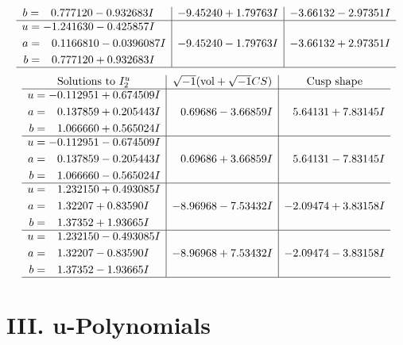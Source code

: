 \documentclass[1p]{elsarticle_modified}
\theoremstyle{definition}
\newcommand{\I}{\sqrt{-1}}
\begin{document}
$$\begin{array}{c|c|c}
\begin{aligned}
b &= \phantom{-}0.777120 - 0.932683 I\end{aligned}
 & -9.45240 + 1.79763 I & -3.66132 - 2.97351 I \\ \hline\begin{aligned}
u &= -1.241630 - 0.425857 I \\
a &= \phantom{-}0.1166810 - 0.0396087 I \\
b &= \phantom{-}0.777120 + 0.932683 I\end{aligned}
 & -9.45240 - 1.79763 I & -3.66132 + 2.97351 I\\
 \hline 
 \end{array}$$\newpage$$\begin{array}{c|c|c}  
\text{Solutions to }I^u_{2}& \I (\text{vol} + \sqrt{-1}CS) & \text{Cusp shape}\\
 \hline 
\begin{aligned}
u &= -0.112951 + 0.674509 I \\
a &= \phantom{-}0.137859 + 0.205443 I \\
b &= \phantom{-}1.066660 + 0.565024 I\end{aligned}
 & \phantom{-}0.69686 - 3.66859 I & \phantom{-}5.64131 + 7.83145 I \\ \hline\begin{aligned}
u &= -0.112951 - 0.674509 I \\
a &= \phantom{-}0.137859 - 0.205443 I \\
b &= \phantom{-}1.066660 - 0.565024 I\end{aligned}
 & \phantom{-}0.69686 + 3.66859 I & \phantom{-}5.64131 - 7.83145 I \\ \hline\begin{aligned}
u &= \phantom{-}1.232150 + 0.493085 I \\
a &= \phantom{-}1.32207 + 0.83590 I \\
b &= \phantom{-}1.37352 + 1.93665 I\end{aligned}
 & -8.96968 - 7.53432 I & -2.09474 + 3.83158 I \\ \hline\begin{aligned}
u &= \phantom{-}1.232150 - 0.493085 I \\
a &= \phantom{-}1.32207 - 0.83590 I \\
b &= \phantom{-}1.37352 - 1.93665 I\end{aligned}
 & -8.96968 + 7.53432 I & -2.09474 - 3.83158 I\\
 \hline 
 \end{array}$$\newpage
\newpage\renewcommand{\arraystretch}{1}
\centering \section*{ III. u-Polynomials}
\end{document}
